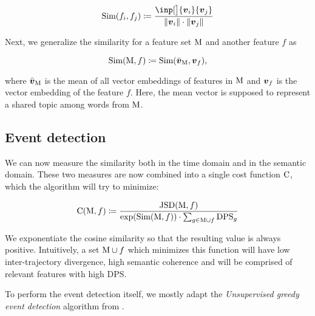 \begin{equation}
	\semsim( f_{i}, f_{j} ) \coloneqq \frac{\inp[\big]{\embed_{i}}{\embed_{j}}}{\| \embed_{i} \| \cdot \| \embed_{j} \|}
\end{equation}

Next, we generalize the similarity for a feature set $\text{M}$ and another feature $f$ as

\begin{equation}
	\semsim( \featset, f ) \coloneqq \semsim( \bar{\embed}_{\featset}, \embed_{f} ),
\end{equation}

where $\bar{\embed}_{\featset}$ is the mean of all vector embeddings of features in $\text{M}$ and $\embed_{f}$ is the vector embedding of the feature $f$. Here, the mean vector is supposed to represent a shared topic among words from $\text{M}$.


\subsection{Event detection}

We can now measure the similarity both in the time domain and in the semantic domain. These two measures are now combined into a single cost function $\text{C}$, which the algorithm will try to minimize:

\begin{equation} \label{eq:cost-function}
	\text{C}( \text{M}, f ) \coloneqq \frac{\text{JSD}( \text{M}, f )}{\exp(\text{Sim}( \text{M}, f )) \cdot \sum_{g \in \text{M} \cup f}{\text{DPS}_{g}}}
\end{equation}

We exponentiate the cosine similarity so that the resulting value is always positive. Intuitively, a set $\text{M} \cup f$ which minimizes this function will have low inter-trajectory divergence, high semantic coherence and will be comprised of relevant features with high DPS.

To perform the event detection itself, we mostly adapt the \textit{Unsupervised greedy event detection} algorithm from \cite{event-detection}.

